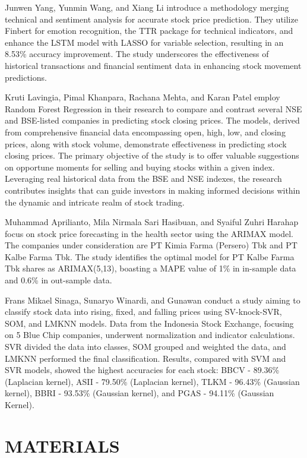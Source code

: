 \documentclass{ieeeojies}
\begin{document}
Junwen Yang, Yunmin Wang, and Xiang Li \cite{r3} introduce a methodology merging technical and sentiment analysis for accurate stock price prediction. They utilize Finbert for emotion recognition, the TTR package for technical indicators, and enhance the LSTM model with LASSO for variable selection, resulting in an 8.53\% accuracy improvement. The study underscores the effectiveness of historical transactions and financial sentiment data in enhancing stock movement predictions.

Kruti Lavingia, Pimal Khanpara, Rachana Mehta, and Karan Patel \cite{r4} employ Random Forest Regression in their research to compare and contrast several NSE and BSE-listed companies in predicting stock closing prices. The models, derived from comprehensive financial data encompassing open, high, low, and closing prices, along with stock volume, demonstrate effectiveness in predicting stock closing prices. The primary objective of the study is to offer valuable suggestions on opportune moments for selling and buying stocks within a given index. Leveraging real historical data from the BSE and NSE indexes, the research contributes insights that can guide investors in making informed decisions within the dynamic and intricate realm of stock trading.

Muhammad Aprilianto, Mila Nirmala Sari Hasibuan, and Syaiful Zuhri Harahap \cite{r5} focus on stock price forecasting in the health sector using the ARIMAX model. The companies under consideration are PT Kimia Farma (Persero) Tbk and PT Kalbe Farma Tbk. The study identifies the optimal model for PT Kalbe Farma Tbk shares as ARIMAX(5,13), boasting a MAPE value of 1\% in in-sample data and 0.6\% in out-sample data.

Frans Mikael Sinaga, Sunaryo Winardi, and Gunawan \cite{r6} conduct a study aiming to classify stock data into rising, fixed, and falling prices using SV-knock-SVR, SOM, and LMKNN models. Data from the Indonesia Stock Exchange, focusing on 5 Blue Chip companies, underwent normalization and indicator calculations. SVR divided the data into classes, SOM grouped and weighted the data, and LMKNN performed the final classification. Results, compared with SVM and SVR models, showed the highest accuracies for each stock: BBCV - 89.36\% (Laplacian kernel), ASII - 79.50\% (Laplacian kernel), TLKM - 96.43\% (Gaussian kernel), BBRI - 93.53\% (Gaussian kernel), and PGAS - 94.11\% (Gaussian Kernel).

\section{MATERIALS}
\end{document}
